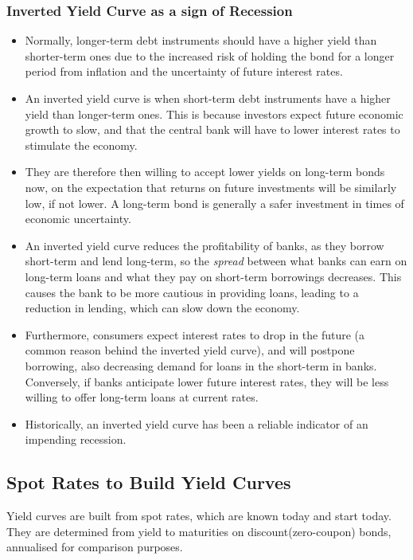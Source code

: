 \subsubsection*{Inverted Yield Curve as a sign of Recession} 
\begin{itemize}
    \item Normally, longer-term debt instruments should have a higher yield than shorter-term ones due to the increased risk of holding the bond for a longer period from inflation and the uncertainty of future interest rates.
    \item An inverted yield curve is when short-term debt instruments have a higher yield than longer-term ones. This is because investors expect future economic growth to slow, and that the central bank will have to lower interest rates to stimulate the economy.
    \item They are therefore then willing to accept lower yields on long-term bonds now, on the expectation that returns on future investments will be similarly low, if not lower. A long-term bond is generally a safer investment in times of economic uncertainty. 
    \item An inverted yield curve reduces the profitability of banks, as they borrow short-term and lend long-term, so the \textit{spread} between what banks can earn on long-term loans and what they pay on short-term borrowings decreases. This causes the bank to be more cautious in providing loans, leading to a reduction in lending, which can slow down the economy. 
    \item Furthermore, consumers expect interest rates to drop in the future (a common reason behind the inverted yield curve), and will postpone borrowing, also decreasing demand for loans in the short-term in banks. Conversely, if banks anticipate lower future interest rates, they will be less willing to offer long-term loans at current rates.
    \item Historically, an inverted yield curve has been a reliable indicator of an impending recession.
\end{itemize}

\subsection*{Spot Rates to Build Yield Curves}
Yield curves are built from spot rates, which are known today and start today. They are determined from yield to maturities on discount(zero-coupon) bonds, annualised for comparison purposes.\\


